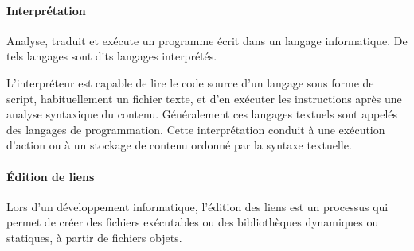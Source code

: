 \documentclass[12pt,a4paper,openany]{book}
\begin{document}
	\paragraph{Interprétation}
	Analyse, traduit et exécute un programme écrit dans un langage informatique. De tels langages sont dits langages interprétés.

	L'interpréteur est capable de lire le code source d'un langage sous forme de script, habituellement un fichier texte, et d'en exécuter les instructions après une analyse syntaxique du contenu. Généralement ces langages textuels sont appelés des langages de programmation. Cette interprétation conduit à une exécution d'action ou à un stockage de contenu ordonné par la syntaxe textuelle.
	\paragraph{Édition de liens} Lors d’un développement informatique, l'édition des liens est un processus qui permet de créer des fichiers exécutables ou des bibliothèques dynamiques ou statiques, à partir de fichiers objets.
	
	\lstlistoflistings{}
\end{document}
